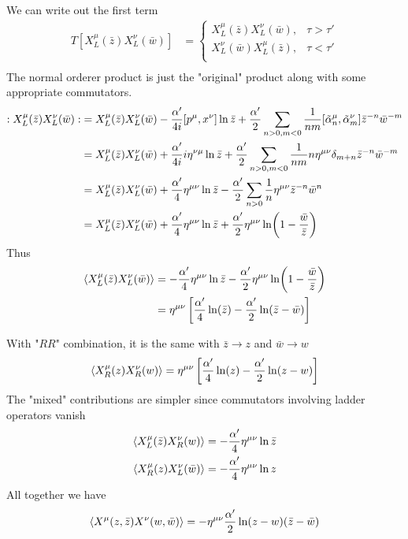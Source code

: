 \begin{enumerate}[label=(\alph*)]
		We can write out the first term
		\begin{align*}
			T[X_L^\mu(\bar{z}) X_L^\nu (\bar{w})]&= 
\begin{cases}
X_L^\mu(\bar{z}) X_L^\nu (\bar{w}), & \tau > \tau' \\
X_L^\nu (\bar{w}) X_L^\mu(\bar{z}), & \tau < \tau' \\
\end{cases}\\
		\end{align*}
		The normal orderer product is just the "original" product along with some appropriate commutators.
		\begin{align*}
		:X_L^\mu(\bar{z}) X_L^\nu (\bar{w}):	&= X_L^\mu(\bar{z}) X_L^\nu (\bar{w}) - \frac{\alpha'}{4i} \comm{p^\mu}{x^\nu} \ln{\bar{z}} + \frac{\alpha'}{2} \sum_{n>0, m<0} \frac{1}{nm} \comm{\tilde\alpha^\mu_n}{\tilde{\alpha}^\nu_m} \bar{z}^{-n} \bar{w}^{-m} \\
															&= X_L^\mu(\bar{z}) X_L^\nu (\bar{w}) + \frac{\alpha'}{4i} i\eta^{\nu\mu} \ln{\bar{z}} + \frac{\alpha'}{2} \sum_{n>0, m<0} \frac{1}{nm} n \eta^{\mu\nu} \delta_{m+n} \bar{z}^{-n} \bar{w}^{-m}\\
																&= X_L^\mu(\bar{z}) X_L^\nu (\bar{w}) + \frac{\alpha'}{4} \eta^{\mu\nu} \ln{\bar{z}} - \frac{\alpha'}{2} \sum_{n>0} \frac{1}{n} \eta^{\mu\nu} \bar{z}^{-n} \bar{w}^{n} \\
																&= X_L^\mu(\bar{z}) X_L^\nu (\bar{w}) + \frac{\alpha'}{4} \eta^{\mu\nu} \ln{\bar{z}} + \frac{\alpha'}{2} \eta^{\mu\nu} \ln(1-\frac{\bar{w}}{\bar{z}}) \\
		\end{align*}
		Thus 
		\begin{align}
			\braket{X_L^\mu(\bar{z}) X_L^\nu (\bar{w})}	&= - \frac{\alpha'}{4} \eta^{\mu\nu} \ln{\bar{z}} - \frac{\alpha'}{2} \eta^{\mu\nu} \ln(1-\frac{\bar{w}}{\bar{z}}) \notag \\
																		&= \eta^{\mu\nu} \left[ \frac{\alpha'}{4} \ln(\bar{z}) - \frac{\alpha'}{2} \ln(\bar{z}-\bar{w}) \right]
		\end{align}
		
		With "$RR$" combination, it is the same with $\bar{z} \rightarrow z$ and $\bar{w} \rightarrow w$
		\begin{equation}
			\braket{X_R^\mu({z}) X_R^\nu ({w})}	= \eta^{\mu\nu} \left[ \frac{\alpha'}{4} \ln({z}) - \frac{\alpha'}{2} \ln({z}-{w}) \right]
		\end{equation}
		The "mixed" contributions are simpler since commutators involving ladder operators vanish
		\begin{align}
			\braket{X_L^\mu(\bar{z}) X_R^\nu ({w})} &= - \frac{\alpha'}{4} \eta^{\mu\nu} \ln{\bar{z}} \\
			\braket{X_R^\mu({z}) X_L^\nu (\bar{w})} &= - \frac{\alpha'}{4} \eta^{\mu\nu} \ln{{z}}
		\end{align}
		All together we have
		\begin{equation}
			\braket{X^\mu (z,\bar{z}) X^\nu(w,\bar{w})} = -\eta^{\mu\nu} \frac{\alpha'}{2} \ln (z-w)(\bar{z}-\bar{w})
		\end{equation}
\end{enumerate}
